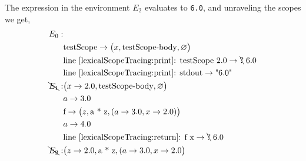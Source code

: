 The expression in the environment $E_2$ evaluates to \lstinline!6.0!, and unraveling the scopes we get,
\begin{align*}
  E_0:&\\
      &\text{testScope} \rightarrow \big(x, \text{testScope-body}, \varnothing\big)\\
      & \text{line~\ref{lexicalScopeTracing:print}: testScope 2.0} \rightarrow \bcancel{\text{?}}\; 6.0\\
      & \text{line~\ref{lexicalScopeTracing:print}: stdout} \rightarrow \text{"6.0"}\\
  \bcancel{E_1}: & \big(x\rightarrow 2.0, \text{testScope-body}, \varnothing\big)\\
      & a \rightarrow 3.0\\
      & \text{f} \rightarrow \big(z, \text{a * z}, (a \rightarrow 3.0, x\rightarrow 2.0)\big)\\
      & a \rightarrow 4.0 \\
      & \text{line~\ref{lexicalScopeTracing:return}: f x} \rightarrow \bcancel{\text{?}}\; 6.0\\
  \bcancel{E_2}: & \big(z \rightarrow 2.0, \text{a * z}, (a \rightarrow 3.0, x\rightarrow 2.0\big)\\
\end{align*}

